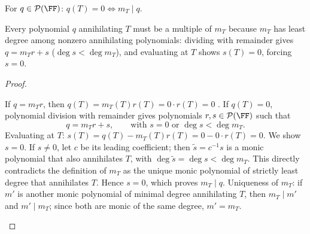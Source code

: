 \documentclass[10pt]{scrartcl}
\begin{document}
\begin{proposition*}\hypertarget{prop-65}{}\label{prop-65}
  For $q\in\PP(\FF)$: $q(T)=0\iff m_T\mid q$.
\end{proposition*}
\begin{ideabox}
Every polynomial $q$ annihilating $T$ must be a multiple of $m_T$ because $m_T$ has least degree among nonzero annihilating polynomials: dividing with remainder gives $q=m_Tr+s$ ($\deg s<\deg m_T$), and evaluating at $T$ shows $s(T)=0$, forcing $s=0$.
\end{ideabox}
\begin{proof}
  \begin{steps}
    \ii If $q=m_Tr$, then $q(T)=m_T(T)r(T)=0\cdot r(T)=0$ .
    \ii If $q(T)=0$, polynomial division with remainder gives polynomials $r,s\in\PP(\FF)$ such that
    \[ q=m_Tr+s,\qquad\text{with }s=0\text{ or }\deg s<\deg m_T. \]
    Evaluating at $T$: $s(T)=q(T)-m_T(T)r(T)=0-0\cdot r(T)=0$.
    \ii We show $s=0$. If $s\ne0$, let $c$ be its leading coefficient; then $\tilde{s}=c^{-1}s$ is a monic polynomial that also annihilates $T$, with $\deg\tilde{s}=\deg s<\deg m_T$. This directly contradicts the definition of $m_T$ as the unique monic polynomial of strictly least degree that annihilates $T$. Hence $s=0$, which proves $m_T\mid q$.
    \ii Uniqueness of $m_T$: if $m'$ is another monic polynomial of minimal degree annihilating $T$, then $m_T\mid m'$ and $m'\mid m_T$; since both are monic of the same degree, $m'=m_T$.
  \end{steps}
\end{proof}
\end{document}
